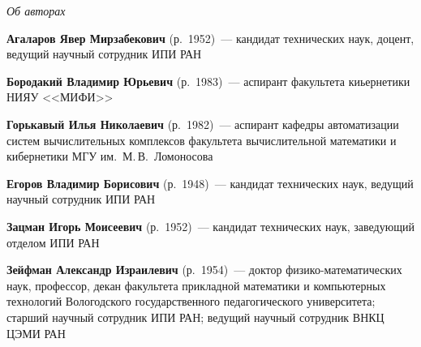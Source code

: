 \begin{center}\LARGE
\textit{Об авторах}
\end{center}
\thispagestyle{empty}

\vspace*{24pt}

\begin{multicols}{2}





\noindent
\textbf{Агаларов Явер Мирзабекович} (р.\ 1952)~---  кандидат технических наук,
доцент, ведущий научный сотрудник ИПИ РАН

\medskip%


\vspace*{6pt}

\noindent
\textbf{Бородакий Владимир Юрьевич} (р.\ 1983)~--- аспирант факультета киьернетики НИЯУ
<<МИФИ>>


\vspace*{6pt}


\noindent
\textbf{Горькавый Илья Николаевич} (р.\ 1982)~--- аспирант кафедры автоматизации
сис\-тем вычислительных комплексов факультета вычислительной
математики и кибернетики МГУ им.\ М.\,В.~Ломоносова

\medskip%

\noindent %
\textbf{Егоров Владимир Борисович} (р.\ 1948)~---  кандидат технических наук,
ведущий научный сотрудник   ИПИ РАН

\medskip%

\noindent
\textbf{Зацман Игорь Моисеевич} (р.\ 1952)~---   кандидат технических наук, 
заведующий отделом ИПИ РАН

\medskip%

\noindent
\textbf{Зейфман Александр Израилевич} (р.\ 1954)~--- доктор
физико-математических наук, профессор, декан факультета прикладной
математики и компьютерных технологий Вологодского государственного
педагогического университета; старший научный сотрудник ИПИ РАН;
ведущий научный сотрудник ВНКЦ ЦЭМИ РАН



\end{multicols}
